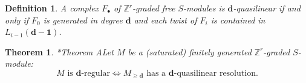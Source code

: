 \documentclass[11pt,reqno]{amsart}
\newtheorem{theorem}[lemma]{Theorem}
\newtheorem{defn}[lemma]{Definition}
\theoremstyle{remark}
\newcommand{\dd}{\mathbf d}
\newcommand{\one}{\mathbf 1}
\newcommand{\K}{\mathbb{K}}
\renewcommand{\P}{\mathbb{P}}
\newcommand{\Z}{\mathbb{Z}}
\begin{document}
\begin{defn}
A complex $F_{\bullet}$ of $\Z^{r}$-graded free $S$-modules is $\dd$-quasilinear if and only if $F_{0}$ is generated in degree $\dd$ and each twist of $F_{i}$ is contained in $L_{i-1}(\dd-\one)$.
\end{defn}

%

\begin{theorem}\cite{bruceHellerSayrafi21}*{Theorem A}\label{thm:mgreg-main}
Let $M$ be a (saturated) finitely generated $\Z^{r}$-graded $S$-module:
\[
\text{$M$ is $\dd$-regular} \iff  \text{$M_{\geq\dd}$ has a $\dd$-quasilinear resolution}.
\]
\end{theorem}
\end{document}
